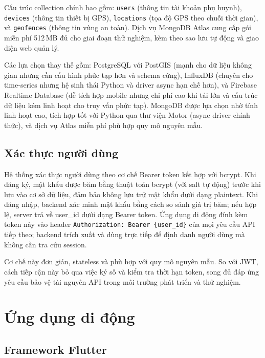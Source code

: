 \documentclass[../DoAn.tex]{subfiles}
\begin{document}
Cấu trúc collection chính bao gồm: \texttt{users} (thông tin tài khoản phụ huynh), \texttt{devices} (thông tin thiết bị GPS), \texttt{locations} (tọa độ GPS theo chuỗi thời gian), và \texttt{geofences} (thông tin vùng an toàn). Dịch vụ MongoDB Atlas cung cấp gói miễn phí 512\,MB đủ cho giai đoạn thử nghiệm, kèm theo sao lưu tự động và giao diện web quản lý.

Các lựa chọn thay thế gồm: PostgreSQL với PostGIS (mạnh cho dữ liệu không gian nhưng cần cấu hình phức tạp hơn và schema cứng), InfluxDB (chuyên cho time-series nhưng hệ sinh thái Python và driver async hạn chế hơn), và Firebase Realtime Database (dễ tích hợp mobile nhưng chi phí cao khi tải lớn và cấu trúc dữ liệu kém linh hoạt cho truy vấn phức tạp). MongoDB được lựa chọn nhờ tính linh hoạt cao, tích hợp tốt với Python qua thư viện Motor (async driver chính thức), và dịch vụ Atlas miễn phí phù hợp quy mô nguyên mẫu.

\subsection{Xác thực người dùng}
\label{subsection:3.3.3}

Hệ thống xác thực người dùng theo cơ chế Bearer token kết hợp với bcrypt. Khi đăng ký, mật khẩu được băm bằng thuật toán bcrypt (với salt tự động) trước khi lưu vào cơ sở dữ liệu, đảm bảo không lưu trữ mật khẩu dưới dạng plaintext. Khi đăng nhập, backend xác minh mật khẩu bằng cách so sánh giá trị băm; nếu hợp lệ, server trả về user\_id dưới dạng Bearer token. Ứng dụng di động đính kèm token này vào header \texttt{Authorization: Bearer \{user\_id\}} của mọi yêu cầu API tiếp theo; backend trích xuất và dùng trực tiếp để định danh người dùng mà không cần tra cứu session.

Cơ chế này đơn giản, stateless và phù hợp với quy mô nguyên mẫu. So với JWT, cách tiếp cận này bỏ qua việc ký số và kiểm tra thời hạn token, song đủ đáp ứng yêu cầu bảo vệ tài nguyên API trong môi trường phát triển và thử nghiệm.

\section{Ứng dụng di động}
\label{section:3.4}

\subsection{Framework Flutter}
\label{subsection:3.4.1}
\end{document}
